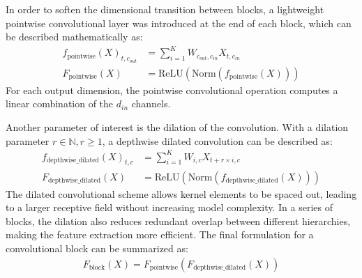 \documentclass[twoside,a4paper]{master}
\begin{document}
In order to soften the dimensional transition between blocks, a lightweight pointwise convolutional layer was introduced at the end of each block, which can be described mathematically as:
\begin{align}
    f_{\text{pointwise}}(X)_{t,c_{out}} &= \sum_{i=1}^K W_{c_{out},c_{in}} X_{t,c_{in}} \\
    F_{\text{pointwise}}(X) &= \text{ReLU}(\text{Norm}(f_{\text{pointwise}}(X)))
\end{align}
For each output dimension, the pointwise convolutional operation computes a linear combination of the \(d_{in}\) channels.

Another parameter of interest is the dilation of the convolution. With a dilation parameter \(r\in \mathbb{N}, r\geq 1\), a depthwise dilated convolution can be described as:
\begin{align}
    f_{\text{depthwise\_dilated}}(X)_{t,c} &= \sum_{i=1}^K W_{i,c} X_{t+r\times i,c} \\
    F_{\text{depthwise\_dilated}}(X) &= \text{ReLU}(\text{Norm}(f_{\text{depthwise\_dilated}}(X)))
\end{align}
The dilated convolutional scheme allows kernel elements to be spaced out, leading to a larger receptive field without increasing model complexity. In a series of blocks, the dilation also reduces redundant overlap between different hierarchies, making the feature extraction more efficient. The final formulation for a convolutional block can be summarized as:
\begin{align}
    F_{\text{block}}(X) = F_{\text{pointwise}}(F_{\text{depthwise\_dilated}}(X))
\end{align}
\end{document}
